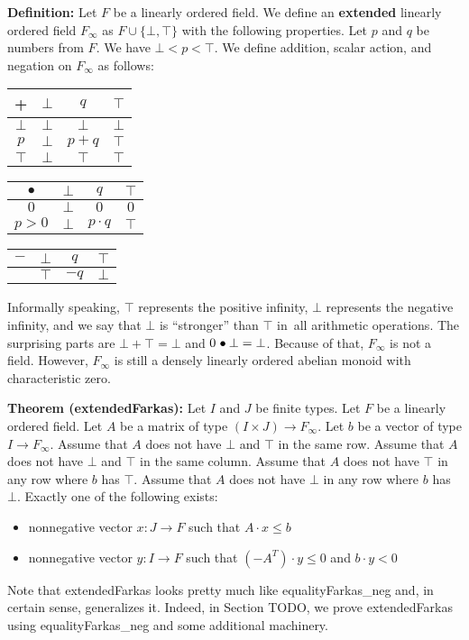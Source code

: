 \documentclass[]{article}
\renewcommand{\.}{\hskip .75pt}
\let\r=\rightarrow
\let\*=\cdot
\begin{document}
\medskip \noindent
\textbf{Definition:}
Let $F$ be a linearly ordered field.
We define an \textbf{extended} linearly ordered field $F_\infty$ as
$F \cup \{ \bot, \top \}$ with the following properties.
Let $p$ and $q$ be numbers from $F$.
We have $\bot < p < \top$.
We define addition, scalar action, and negation on $F_\infty$ as follows:
\begin{center}
	\begin{tabular}{ c || c | c | c | }
		+ & $\bot$ & $q$ & $\top$  \\
		\hline\hline
		$\bot$ & $\bot$ & $\bot$ & $\bot$  \\ 
		\hline
		$p$ & $\bot$ & $p\!+\!q$ & $\top$  \\ 
		\hline
		$\top$ & $\bot$ & $\top$ & $\top$ \\ 
		\hline
	\end{tabular}
	\qquad\qquad\qquad
	\begin{tabular}{ c || c | c | c | }
		$\bullet$ & $\bot$ & $q$ & $\top$  \\
		\hline\hline
		$0$ & $\bot$ & $0$ & $0$  \\ 
		\hline
		$p>0$ & $\bot$ & $p \cdot q$ & $\top$  \\ 
		\hline
	\end{tabular}
	\qquad\qquad\qquad
	\begin{tabular}{ c || c | c | c }
	$-$ & $\bot$ & $q$ & $\top$  \\
	\hline\hline
	& $\top$ & $-q$ & $\bot$  
	\end{tabular}
\end{center}
Informally speaking, $\top$ represents the positive infinity,
$\bot$ represents the negative infinity, and we say that
$\bot$ is ``stronger'' than $\top$ in~all arithmetic operations.
The surprising parts are $\bot + \top = \bot$ and $0 \.\bullet \bot = \bot$.
Because of that, $F_\infty$ is not a field.
However, $F_\infty$ is still a densely linearly ordered abelian monoid
with characteristic zero.

\medskip \noindent
\textbf{Theorem (extendedFarkas):}
Let $I$ and $J$ be finite types.
Let $F$ be a linearly ordered field.
Let $A$ be a matrix of type $(I \times J) \r F_\infty$.
Let $b$ be a vector of type $I \r F_\infty$.
Assume that $A$ does not have $\bot$ and $\top$ in the same row.
Assume that $A$ does not have $\bot$ and $\top$ in the same column.
Assume that $A$ does not have $\top$ in any row where $b$ has $\top$.
Assume that $A$ does not have $\bot$ in any row where $b$ has~$\bot$.
Exactly one of the following exists:
\begin{itemize}
\item nonnegative vector $x : J \r F$ such that $A \* x \le b$
\item nonnegative vector $y : I \r F$ such that $(-A^T) \* y \le 0$ and $b \* y < 0$
\end{itemize}
Note that extendedFarkas looks pretty much like equalityFarkas\_neg and,
in certain sense, generalizes it. Indeed, in Section TODO, we prove
extendedFarkas using equalityFarkas\_neg and some additional machinery.
\end{document}
